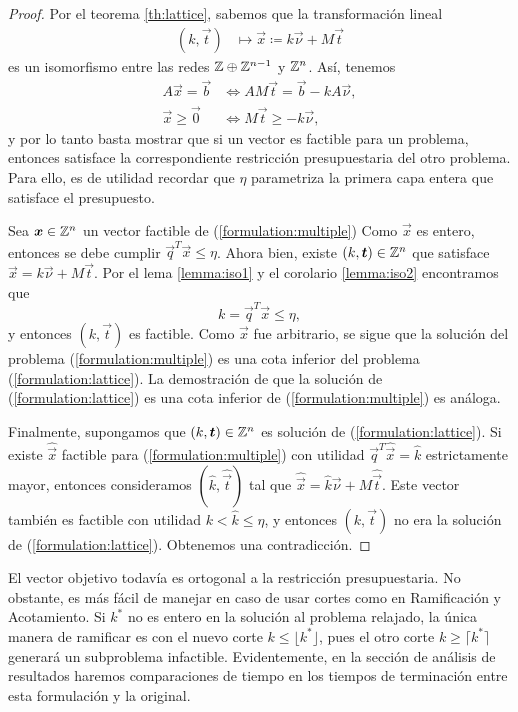 \begin{proof}
	Por el teorema \ref{th:lattice}, sabemos que la transformación lineal
	\begin{align*}
		(k, \vec{t}) &\mapsto \vec{x} \coloneq k\vec{\nu} + M\vec{t}
	\end{align*}
	es un isomorfismo entre las redes $\mathbb{Z} \oplus \mathbb{Z}^{n - 1}$ y $\mathbb{Z}^n$. Así, tenemos
	\begin{align*}
		A\vec{x} = \vec{b} &\iff AM\vec{t} = \vec{b} - kA\vec{\nu}, \\
		\vec{x} \geq \vec{0} &\iff M\vec{t} \geq -k\vec{\nu},
	\end{align*}
	y por lo tanto basta mostrar que si un vector es factible para un problema, entonces satisface
	la correspondiente restricción presupuestaria del otro problema. Para ello, es de utilidad
	recordar que $\eta$ parametriza la primera capa entera que satisface el presupuesto.

	Sea $\boldsymbol{x} \in \mathbb{Z}^n$ un vector factible de (\ref{formulation:multiple}) Como $\vec{x}$ es
	entero, entonces se debe cumplir $\vec{q}^T\vec{x} \leq \eta$. Ahora bien, existe $(k, \boldsymbol{t})
	\in \mathbb{Z}^n$ que satisface $\vec{x} = k\vec{\nu} + M\vec{t}$. Por el lema \ref{lemma:iso1} y el
	corolario \ref{lemma:iso2} encontramos que
	\begin{equation*}
		k = \vec{q}^T\vec{x} \leq \eta,
	\end{equation*}
	y entonces $(k, \vec{t})$ es factible. Como $\vec{x}$ fue arbitrario, se sigue que la solución
	del problema (\ref{formulation:multiple}) es una cota inferior del problema
	(\ref{formulation:lattice}). La demostración de que la solución de (\ref{formulation:lattice})
	es una cota inferior de (\ref{formulation:multiple}) es análoga.

	Finalmente, supongamos que $(k, \boldsymbol{t}) \in \mathbb{Z}^n$ es solución de (\ref{formulation:lattice}).
	Si existe $\hat{\vec{x}}$ factible para (\ref{formulation:multiple}) con utilidad
	$\vec{q}^T\hat{\vec{x}} = \hat{k}$ estrictamente mayor, entonces consideramos $(\hat{k},
	\hat{\vec{t}})$ tal que $\hat{\vec{x}} = \hat{k}\vec{\nu} + M\hat{\vec{t}}$. Este vector
	también es factible con utilidad $k < \hat{k} \leq \eta$, y entonces $(k, \vec{t})$ no era la
	solución de (\ref{formulation:lattice}). Obtenemos una contradicción.
\end{proof}

\begin{observation}
	El vector objetivo todavía es ortogonal a la restricción presupuestaria. No obstante, es más
	fácil de manejar en caso de usar cortes como en Ramificación y Acotamiento. Si $k^*$ no es
	entero en la solución al problema relajado, la única manera de ramificar es con el nuevo corte
	$k \leq \lfloor k^* \rfloor$, pues el otro corte $k \geq \lceil k^* \rceil$ generará un
	subproblema infactible. Evidentemente, en la sección de análisis de resultados haremos
	comparaciones de tiempo en los tiempos de terminación entre esta formulación y la original.
\end{observation}


